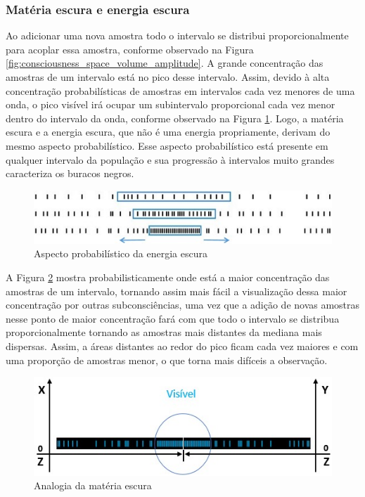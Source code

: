 \subsubsection{Matéria escura e energia escura}
Ao adicionar uma nova amostra todo o intervalo se distribui proporcionalmente para acoplar essa amostra, conforme observado na Figura \ref{fig:consciousness_space_volume_amplitude}. A grande concentração das amostras de um intervalo está no pico desse intervalo. Assim, devido à alta concentração probabilísticas de amostras em intervalos cada vez menores de uma onda, o pico visível irá ocupar um subintervalo proporcional cada vez menor dentro do intervalo da onda, conforme observado na Figura \ref{fig:consciousness_dark_matter_dark_energy}. Logo, a matéria escura e a energia escura, que não é uma energia propriamente, derivam do mesmo aspecto probabilístico. Esse aspecto probabilístico está presente em qualquer intervalo da população e sua progressão à intervalos muito grandes caracteriza os buracos negros.
	\begin{figure}[H]
	\caption{Aspecto probabilístico da energia escura}
	\label{fig:consciousness_dark_matter_dark_energy}
	\centering
	\includegraphics[scale=.9]{sections/images/consciousness_dark_matter_dark_energy.jpg}
	\end{figure}

A Figura \ref{fig:consciousness_dark_matter_dark_energy_wave} mostra probabilisticamente onde está a maior concentração das amostras de um intervalo, tornando assim mais fácil a visualização dessa maior concentração por outras subconsciências, uma vez que a adição de novas amostras nesse ponto de maior concentração fará com que todo o intervalo se distribua proporcionalmente tornando as amostras mais distantes da mediana mais dispersas. Assim, a áreas distantes ao redor do pico ficam cada vez maiores e com uma proporção de amostras menor, o que torna mais difíceis a observação.
	\begin{figure}[H]
	\caption{Analogia da matéria escura}
	\label{fig:consciousness_dark_matter_dark_energy_wave}
	\centering
	\includegraphics[scale=.85]{sections/images/consciousness_dark_matter_dark_energy_wave.jpg}
	\end{figure}

